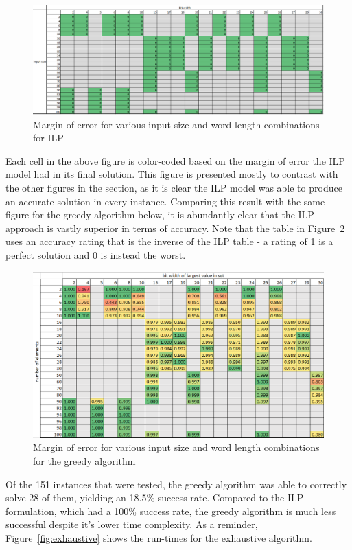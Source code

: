 \documentclass{article}
\begin{document}
\begin{figure}[h]
\centering
\includegraphics[width=12cm]{p4_ILP_mg.png}
\caption{Margin of error for various input size and word length combinations for ILP}
\label{fig:ilp}
\end{figure}

Each cell in the above figure is color-coded based on the margin of error
the ILP model had in its final solution. This figure is presented mostly to
contrast with the other figures in the section, as it is clear the ILP model
was able to produce an accurate solution in every instance. Comparing this result
with the same figure for the greedy algorithm below, it is abundantly clear
that the ILP approach is vastly superior in terms of accuracy. Note that the
table in Figure~\ref{fig:greedy} uses an accuracy rating that is the inverse of the
ILP table - a rating of 1 is a perfect solution and 0 is instead the worst.

\begin{figure}[h]
\centering
\includegraphics[width=12cm]{P3_margin.png}
\caption{Margin of error for various input size and word length combinations for the greedy algorithm}
\label{fig:greedy}
\end{figure}

Of the 151 instances that were tested, the greedy algorithm was able to
correctly solve 28 of them, yielding an 18.5\% success rate. Compared to the
ILP formulation, which had a 100\% success rate, the greedy algorithm 
is much less successful despite it's lower time complexity. As a reminder,
Figure~\ref{fig:exhaustive} shows the run-times for the exhaustive algorithm.
\end{document}
